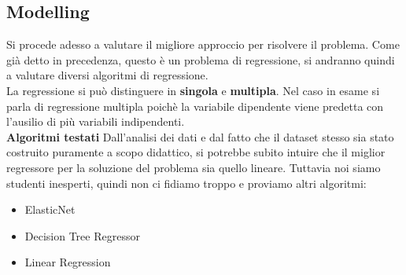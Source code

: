 \documentclass{article}
\begin{document}
    \subsection{Modelling}
    Si procede adesso a valutare il migliore approccio per risolvere il problema. Come già detto in precedenza, questo è un problema di regressione, si andranno quindi a valutare diversi algoritmi di regressione.\\
    La regressione si può distinguere in \textbf{singola} e \textbf{multipla}. Nel caso in esame si parla di regressione multipla poichè la variabile dipendente viene predetta con l'ausilio di più variabili indipendenti.\newline\\
    \textbf{Algoritmi testati}\newline
    Dall'analisi dei dati e dal fatto che il dataset stesso sia stato costruito puramente a scopo didattico, si potrebbe subito intuire che il miglior regressore per la soluzione del problema sia quello lineare. Tuttavia noi siamo studenti inesperti, quindi non ci fidiamo troppo e proviamo altri algoritmi: 
    \begin{itemize}
        \item ElasticNet
        \item Decision Tree Regressor
        \item Linear Regression
    \end{itemize}
    \newpage
\end{document}

